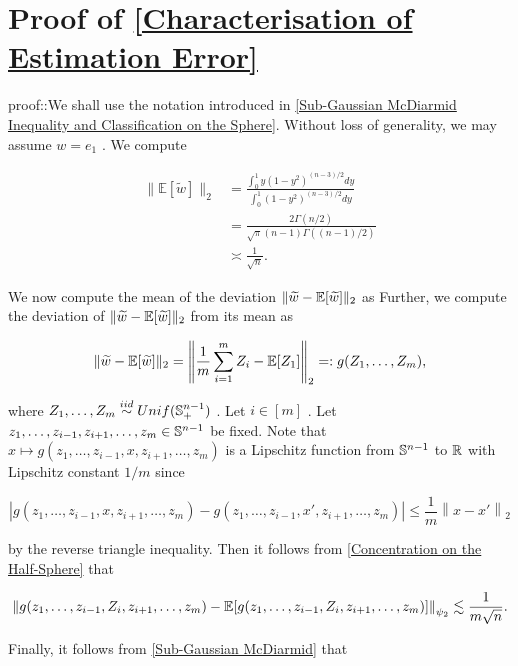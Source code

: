 \documentclass{article}
\begin{document}
\section{Proof of \autoref{Characterisation of Estimation Error}}
\label{section:Proof of \autoref{Characterisation of Estimation Error}}
proof::We shall use the notation introduced in \autoref{Sub-Gaussian McDiarmid Inequality and Classification on the Sphere}. Without loss of generality, we may assume  $w = e_1$ . We compute


\begin{align*}
\|\mathbb{E} [\widetilde{w}]\|_2 &= \frac{\int_0^1 y (1-y^2)^{(n-3)/2}dy}{\int_0^1 (1-y^2)^{(n-3)/2} dy}\\
&= \frac{2 \Gamma(n/2)}{\sqrt{\pi} (n-1) \Gamma((n-1)/2)}\\
&\asymp \frac{1}{\sqrt{n}}. 
\end{align*}

We now compute the mean of the deviation  $\|\widetilde{w} -\mathbb{E}[\widetilde{w}]\|_2$  as Further, we compute the deviation of  $\|\widetilde{w} -\mathbb{E}[\widetilde{w}]\|_2$  from its mean as


\begin{equation*}
\| \widetilde{w} - \mathbb{E}[\widetilde{w}]\|_2 = \left\|\frac{1}{m}\sum_{i=1}^m Z_i - \mathbb{E}[Z_1]\right\|_2 =: g(Z_1, \dots, Z_m),
\end{equation*}

where  $Z_1, \dots, Z_m \stackrel{iid}{\sim} Unif(\mathbb{S}^{n-1}_+)$ . Let  $i \in [m]$ . Let  $z_1, \dots, z_{i-1}, z_{i+1}, \dots, z_m \in \mathbb{S}^{n-1}$  be fixed. Note that  $x \mapsto g(z_1, \dots, z_{i-1}, x, z_{i+1}, \dots, z_m)$   is a Lipschitz function from  $\mathbb{S}^{n-1}$  to  $\mathbb{R}$  with Lipschitz constant  $1/m$  since


\begin{equation*}
|g(z_1, \dots, z_{i-1}, x, z_{i+1}, \dots, z_m) - g(z_1, \dots, z_{i-1}, x', z_{i+1}, \dots, z_m)| \le \frac{1}{m}\left\|x-x'\right\|_2
\end{equation*}

by the reverse triangle inequality. Then it follows from \autoref{Concentration on the Half-Sphere} that


\begin{equation*}
\left\|g(z_1, \dots, z_{i-1}, Z_i, z_{i+1}, \dots, z_m) - \mathbb{E}[g(z_1, \dots, z_{i-1}, Z_i, z_{i+1}, \dots, z_m)]\right\|_{\psi_2} \lesssim \frac{1}{m\sqrt{n}}.
\end{equation*}

Finally, it follows from \autoref{Sub-Gaussian McDiarmid} that
\end{document}
